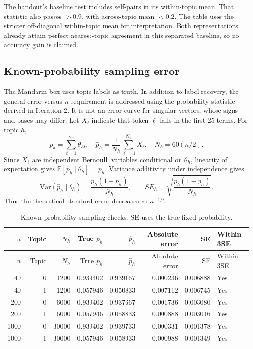 \documentclass[11pt]{article}
\renewcommand{\arraystretch}{1.15}
\begin{document}
The handout's baseline test includes self-pairs in its within-topic mean.
That statistic also passes $>0.9$, with across-topic mean $<0.2$.
The table uses the stricter off-diagonal within-topic mean for interpretation.
Both representations already attain perfect nearest-topic agreement
in this separated baseline, so no accuracy gain is claimed.

\subsection{Known-probability sampling error}
The Mandarin box uses topic labels as truth. In addition to label
recovery, the general error-versus-$n$ requirement is addressed using
the probability statistic derived in Iteration 2. It is not an error
curve for singular vectors, whose signs and bases may differ.
Let $X_\ell$ indicate that token $\ell$ falls in the first 25 terms.
For topic $h$,
\[
p_h=\sum_{t=1}^{25}\theta_{ht},\quad
\widehat p_h=\frac{1}{N_h}\sum_{\ell=1}^{N_h}X_\ell,\quad
N_h=60(n/2).
\]
Since $X_\ell$ are independent Bernoulli variables conditional on
$\theta_h$, linearity of expectation gives
$\mathbb E[\widehat p_h\mid\theta_h]=p_h$.
Variance additivity under independence gives
\[
\mathrm{Var}(\widehat p_h\mid\theta_h)
=\frac{p_h(1-p_h)}{N_h},\qquad
SE_h=\sqrt{\frac{p_h(1-p_h)}{N_h}}.
\]
Thus the theoretical standard error decreases as $n^{-1/2}$.
{\small\renewcommand{\arraystretch}{1.05}
\begin{longtable}{rrrrrrrl}
\caption{Known-probability sampling checks. SE uses the true fixed probability.}\\
\toprule
$n$ & Topic & $N_h$ & True $p_h$ & $\widehat p_h$ & Absolute error & SE & Within 3SE \\ \midrule\endfirsthead
\toprule
$n$ & Topic & $N_h$ & True $p_h$ & $\widehat p_h$ & Absolute error & SE & Within 3SE \\ \midrule\endhead
40 & 0 & 1200 & 0.939402 & 0.939167 & 0.000236 & 0.006888 & Yes \\
40 & 1 & 1200 & 0.057946 & 0.050833 & 0.007112 & 0.006745 & Yes \\
200 & 0 & 6000 & 0.939402 & 0.937667 & 0.001736 & 0.003080 & Yes \\
200 & 1 & 6000 & 0.057946 & 0.058833 & 0.000888 & 0.003016 & Yes \\
1000 & 0 & 30000 & 0.939402 & 0.939733 & 0.000331 & 0.001378 & Yes \\
1000 & 1 & 30000 & 0.057946 & 0.058933 & 0.000988 & 0.001349 & Yes \\
\bottomrule
\end{longtable}
}
\end{document}
